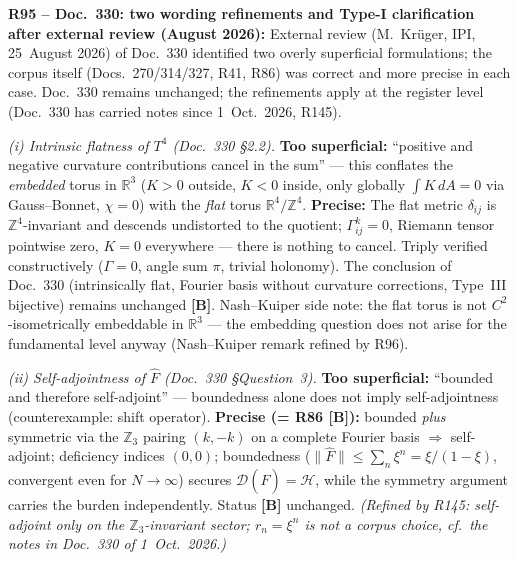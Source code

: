 \medskip

\textbf{R95 -- Doc.~330: two wording refinements and Type-I clarification after external review (August 2026):}
External review (M.~Krüger, IPI, 25~August 2026) of Doc.~330 identified
two overly superficial formulations; the corpus itself
(Docs.~270/314/327, R41, R86) was correct and more precise in each case.
Doc.~330 remains unchanged; the refinements apply at the register level (Doc.~330 has carried notes since 1~Oct.~2026, R145).

\emph{(i) Intrinsic flatness of $T^4$ (Doc.~330 §2.2).}
\textbf{Too superficial:} ``positive and negative curvature contributions
cancel in the sum'' --- this conflates the \emph{embedded} torus in
$\mathbb{R}^3$ ($K>0$ outside, $K<0$ inside, only globally
$\int K\,dA = 0$ via Gauss--Bonnet, $\chi=0$) with the \emph{flat}
torus $\mathbb{R}^4/\mathbb{Z}^4$.
\textbf{Precise:} The flat metric $\delta_{ij}$ is
$\mathbb{Z}^4$-invariant and descends undistorted to the quotient;
$\Gamma^k_{ij}=0$, Riemann tensor pointwise zero, $K=0$ everywhere ---
there is nothing to cancel. Triply verified constructively
($\Gamma=0$, angle sum $\pi$, trivial holonomy).
The conclusion of Doc.~330 (intrinsically flat, Fourier basis without
curvature corrections, Type~III bijective) remains unchanged \textbf{[B]}.
Nash--Kuiper side note: the flat torus is not $C^2$-isometrically
embeddable in $\mathbb{R}^3$ --- the embedding question does not arise
for the fundamental level anyway (Nash--Kuiper remark refined by R96).

\emph{(ii) Self-adjointness of $\hat F$ (Doc.~330 §Question~3).}
\textbf{Too superficial:} ``bounded and therefore self-adjoint''
--- boundedness alone does not imply self-adjointness
(counterexample: shift operator).
\textbf{Precise (= R86 \textbf{[B]}):} bounded \emph{plus} symmetric
via the $\mathbb{Z}_3$ pairing $(k,-k)$ on a complete Fourier basis
$\Rightarrow$ self-adjoint; deficiency indices $(0,0)$; boundedness
($\|\hat F\| \le \sum_n \xi^n = \xi/(1-\xi)$, convergent even for
$N\to\infty$) secures $\mathcal{D}(\hat F)=\mathcal{H}$, while the
symmetry argument carries the burden independently.
Status \textbf{[B]} unchanged. \emph{(Refined by R145: self-adjoint only on the $\mathbb{Z}_3$-invariant sector; $r_n=\xi^n$ is not a corpus choice, cf.\ the notes in Doc.~330 of 1~Oct.~2026.)}

